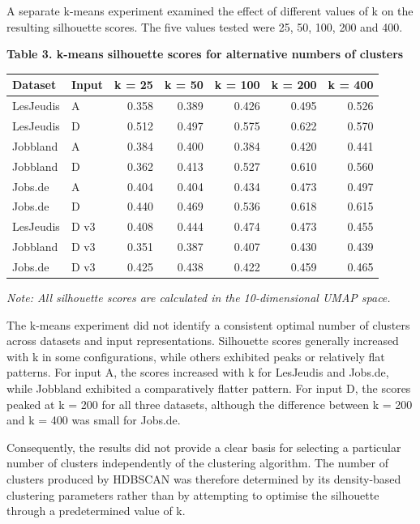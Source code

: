 \documentclass[
  letterpaper,
  DIV=11,
  numbers=noendperiod,
  sfdefaults=false]{scrartcl}
\newcounter{none} %
\begin{document}
A separate k-means experiment examined the effect of different values of
k on the resulting silhouette scores. The five values tested were 25,
50, 100, 200 and 400.

\textbf{Table 3. k-means silhouette scores for alternative numbers of
clusters}

{\def\LTcaptype{none} %
\begin{longtable}[]{@{}llrrrrr@{}}
\toprule\noalign{}
Dataset & Input & k = 25 & k = 50 & k = 100 & k = 200 & k = 400 \\
\midrule\noalign{}
\endhead
\bottomrule\noalign{}
\endlastfoot
LesJeudis & A & 0.358 & 0.389 & 0.426 & 0.495 & 0.526 \\
LesJeudis & D & 0.512 & 0.497 & 0.575 & 0.622 & 0.570 \\
Jobbland & A & 0.384 & 0.400 & 0.384 & 0.420 & 0.441 \\
Jobbland & D & 0.362 & 0.413 & 0.527 & 0.610 & 0.560 \\
Jobs.de & A & 0.404 & 0.404 & 0.434 & 0.473 & 0.497 \\
Jobs.de & D & 0.440 & 0.469 & 0.536 & 0.618 & 0.615 \\
LesJeudis & D v3 & 0.408 & 0.444 & 0.474 & 0.473 & 0.455 \\
Jobbland & D v3 & 0.351 & 0.387 & 0.407 & 0.430 & 0.439 \\
Jobs.de & D v3 & 0.425 & 0.438 & 0.422 & 0.459 & 0.465 \\
\end{longtable}
}

\emph{Note: All silhouette scores are calculated in the 10-dimensional
UMAP space.}

The k-means experiment did not identify a consistent optimal number of
clusters across datasets and input representations. Silhouette scores
generally increased with k in some configurations, while others
exhibited peaks or relatively flat patterns. For input A, the scores
increased with k for LesJeudis and Jobs.de, while Jobbland exhibited a
comparatively flatter pattern. For input D, the scores peaked at k = 200
for all three datasets, although the difference between k = 200 and k =
400 was small for Jobs.de.

Consequently, the results did not provide a clear basis for selecting a
particular number of clusters independently of the clustering algorithm.
The number of clusters produced by HDBSCAN was therefore determined by
its density-based clustering parameters rather than by attempting to
optimise the silhouette through a predetermined value of k.
\end{document}
